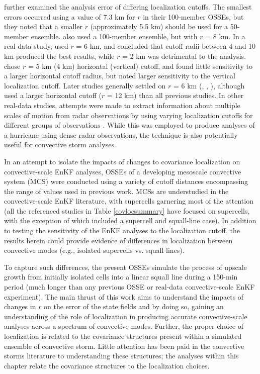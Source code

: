 \citet{cayaetal05} further examined the analysis error of differing localization cutoffs. The smallest errors occurred using a value of 7.3 km for \( r \) in their 100-member OSSEs, but they noted that a smaller \( r \) (approximately 5.5 km) should be used for a 50-member ensemble. \citet{tongxue05} also used a 100-member ensemble, but with \( r \) = 8 km. In a real-data study, \citet{dowelletal04} used \( r \) = 6 km, and concluded that cutoff radii between 4 and 10 km produced the best results, while \( r \) = 2 km was detrimental to the analysis. \citet{aksoyetal09} chose \( r \) = 5 km (4 km) horizontal (vertical) cutoff, and found little sensitivity to a larger horizontal cutoff radius, but noted larger sensitivity to the vertical localization cutoff. Later studies generally settled on \( r \) = 6 km (\citealt{dowellwicker09}, \citealt{dowelletal11}, \citealt{dongetal11}), although \citet{dawsonetal12} used a larger horizontal cutoff (\( r \) = 12 km) than all previous studies. In other real-data studies, attempts were made to extract information about multiple scales of motion from radar observations by using varying localization cutoffs for different groups of observations \citep{zhangetal09}. While this was employed to produce analyses of a hurricane using dense radar observations, the technique is also potentially useful for convective storm analyses.

In an attempt to isolate the impacts of changes to covariance localization on convective-scale EnKF analyses, OSSEs of a developing mesoscale convective system (MCS) were conducted using a variety of cutoff distances encompassing the range of values used in previous work. MCSs are understudied in the convective-scale EnKF literature, with supercells garnering most of the attention (all the referenced studies in Table \ref{covlocsummary} have focused on supercells, with the exception of \citet{aksoyetal09} which included a supercell and squall-line case). In addition to testing the sensitivity of the EnKF analyses to the localization cutoff, the results herein could provide evidence of differences in localization between convective modes (e.g., isolated supercells vs. squall lines).

To capture such differences, the present OSSEs simulate the process of upscale growth from initially isolated cells into a linear squall line during a 150-min period (much longer than any previous OSSE or real-data convective-scale EnKF experiment). The main thrust of this work aims to understand the impacts of changes in \(r\) on the error of the state fields and by doing so, gaining an understanding of the role of localization in producing accurate convective-scale analyses across a spectrum of convective modes. Further, the proper choice of localization is related to the covariance structures present within a simulated ensemble of convective storm. Little attention has been paid in the convective storms literature to understanding these structures; the analyses within this chapter relate the covariance structures to the localization choices.

